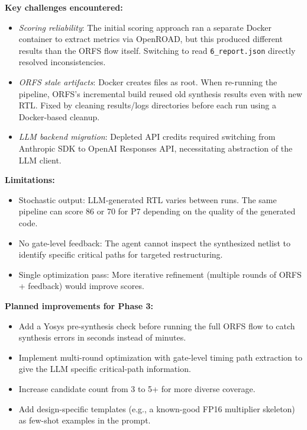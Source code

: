 \documentclass[10pt]{article}
\begin{document}
\textbf{Key challenges encountered:}
\begin{itemize}[topsep=2pt,itemsep=0pt]
  \item \emph{Scoring reliability}: The initial scoring approach ran a separate Docker container to extract metrics via OpenROAD, but this produced different results than the ORFS flow itself. Switching to read \texttt{6\_report.json} directly resolved inconsistencies.
  \item \emph{ORFS stale artifacts}: Docker creates files as root. When re-running the pipeline, ORFS's incremental build reused old synthesis results even with new RTL. Fixed by cleaning results/logs directories before each run using a Docker-based cleanup.
  \item \emph{LLM backend migration}: Depleted API credits required switching from Anthropic SDK to OpenAI Responses API, necessitating abstraction of the LLM client.
\end{itemize}

\textbf{Limitations:}
\begin{itemize}[topsep=2pt,itemsep=0pt]
  \item Stochastic output: LLM-generated RTL varies between runs. The same pipeline can score 86 or 70 for P7 depending on the quality of the generated code.
  \item No gate-level feedback: The agent cannot inspect the synthesized netlist to identify specific critical paths for targeted restructuring.
  \item Single optimization pass: More iterative refinement (multiple rounds of ORFS + feedback) would improve scores.
\end{itemize}

\textbf{Planned improvements for Phase 3:}
\begin{itemize}[topsep=2pt,itemsep=0pt]
  \item Add a Yosys pre-synthesis check before running the full ORFS flow to catch synthesis errors in seconds instead of minutes.
  \item Implement multi-round optimization with gate-level timing path extraction to give the LLM specific critical-path information.
  \item Increase candidate count from 3 to 5+ for more diverse coverage.
  \item Add design-specific templates (e.g., a known-good FP16 multiplier skeleton) as few-shot examples in the prompt.
\end{itemize}
\end{document}
